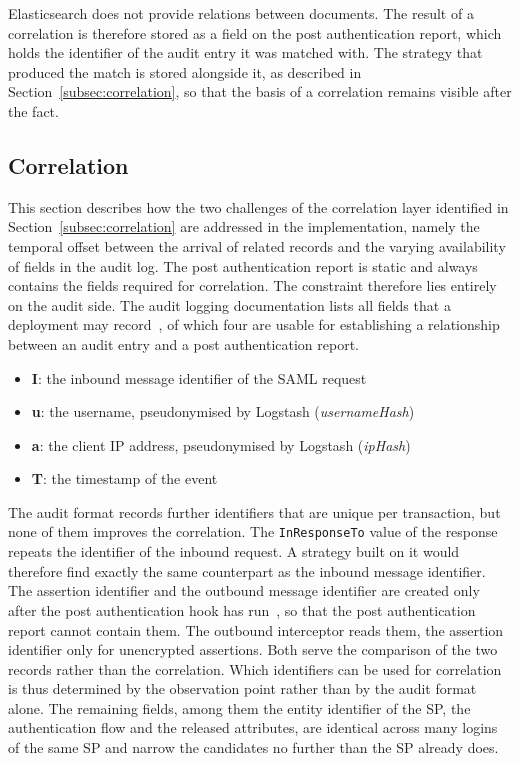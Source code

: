 \documentclass[../main.tex]{subfiles}
\begin{document}
Elasticsearch does not provide relations between documents. 
The result of a correlation is therefore stored as a field on the post authentication report, 
which holds the identifier of the audit entry it was matched with. 
The strategy that produced the match is stored alongside it, as described in 
Section~\ref{subsec:correlation}, so that the basis of a correlation remains visible 
after the fact.

\subsection{Correlation}\label{subsec:impl-correlation}

This section describes how the two challenges of the correlation layer identified in 
Section~\ref{subsec:correlation} are addressed in the implementation, namely the temporal 
offset between the arrival of related records and the varying availability of fields 
in the audit log. 
The post authentication report is static and always contains the fields required for correlation. 
The constraint therefore lies entirely on the audit side. 
The audit logging documentation lists all fields that a deployment may 
record~\cite{AuditLoggingConfiguration}, of which four are usable for establishing a 
relationship between an audit entry and a post authentication report. 

\begin{itemize}
    \item \textbf{I}: the inbound message identifier of the SAML request
    \item \textbf{u}: the username, pseudonymised by Logstash (\textit{usernameHash})
    \item \textbf{a}: the client IP address, pseudonymised by Logstash (\textit{ipHash})
    \item \textbf{T}: the timestamp of the event
\end{itemize}

The audit format records further identifiers that are unique per transaction, but none of them 
improves the correlation. 
The \texttt{InResponseTo} value of the response repeats the identifier of the inbound request. 
A strategy built on it would therefore find exactly the same counterpart as the inbound message 
identifier. 
The assertion identifier and the outbound message identifier are created only after the post 
authentication hook has run~\cite{ProfileHandling, AuditLoggingConfiguration}, so that the post 
authentication report cannot contain them. 
The outbound interceptor reads them, the assertion identifier only for unencrypted assertions. 
Both serve the comparison of the two records rather than the correlation. 
Which identifiers can be used for correlation is thus determined by the observation point rather 
than by the audit format alone. 
The remaining fields, among them the entity identifier of the SP, the authentication flow and the 
released attributes, are identical across many logins of the same SP and narrow the candidates no 
further than the SP already does. 
\end{document}
